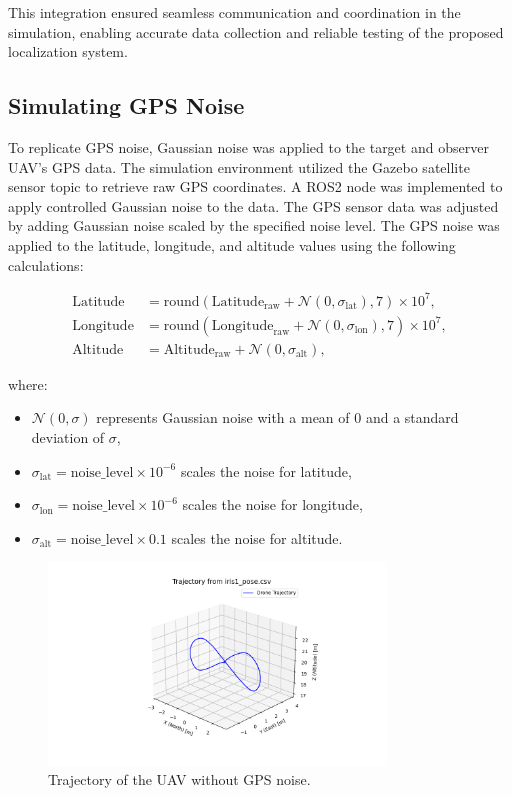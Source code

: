 This integration ensured seamless communication and coordination in the simulation, enabling accurate data collection and reliable testing of the proposed localization system.

\subsection{Simulating GPS Noise}

To replicate GPS noise, Gaussian noise was applied to the target and observer UAV’s GPS data. The simulation environment utilized the Gazebo satellite sensor topic to retrieve raw GPS coordinates. A ROS2 node was implemented to apply controlled Gaussian noise to the data. The GPS sensor data was adjusted by adding Gaussian noise scaled by the specified noise level.
The GPS noise was applied to the latitude, longitude, and altitude values using the following calculations:

\begin{align*}
    \text{Latitude} &= \text{round}(\text{Latitude}_{\text{raw}} + \mathcal{N}(0, \sigma_{\text{lat}}), 7) \times 10^7, \\
    \text{Longitude} &= \text{round}(\text{Longitude}_{\text{raw}} + \mathcal{N}(0, \sigma_{\text{lon}}), 7) \times 10^7, \\
    \text{Altitude} &= \text{Altitude}_{\text{raw}} + \mathcal{N}(0, \sigma_{\text{alt}}),
\end{align*}

where:
\begin{itemize}
    \item \(\mathcal{N}(0, \sigma)\) represents Gaussian noise with a mean of 0 and a standard deviation of \(\sigma\),
    \item \(\sigma_{\text{lat}} = \text{noise\_level} \times 10^{-6}\) scales the noise for latitude,
    \item \(\sigma_{\text{lon}} = \text{noise\_level} \times 10^{-6}\) scales the noise for longitude,
    \item \(\sigma_{\text{alt}} = \text{noise\_level} \times 0.1\) scales the noise for altitude.
\end{itemize}
\begin{figure}[H]
    \centering
    \includegraphics[width=0.8\textwidth]{Imgs/non_noise.png}
    \caption{Trajectory of the UAV without GPS noise.}
    \label{fig:non_noised_trajectory}
\end{figure}

